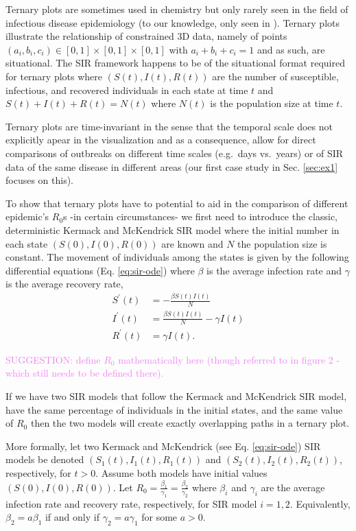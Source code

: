 \documentclass[
  shortnames]{jss}
\begin{document}
Ternary plots are sometimes used in chemistry \citep[][]{Gillespie1976}
but only rarely seen in the field of infectious disease epidemiology (to
our knowledge, only seen in \cite{}). Ternary plots illustrate the
relationship of constrained 3D data, namely of points
\((a_i, b_i, c_i) \in [0,1] \times [0,1] \times [0,1]\) with
\(a_i+ b_i + c_i =1\) and as such, are situational. The SIR framework
happens to be of the situational format required for ternary plots where
\((S(t), I(t), R(t))\) are the number of susceptible, infectious, and
recovered individuals in each state at time \(t\) and
\(S(t) + I(t) + R(t) = N(t)\) where \(N(t)\) is the population size at
time \(t\).

Ternary plots are time-invariant in the sense that the temporal scale
does not explicitly apear in the visualization and as a consequence,
allow for direct comparisons of outbreaks on different time scales
(e.g.~days vs.~years) or of SIR data of the same disease in different
areas (our first case study in Sec. \ref{sec:ex1} focuses on this).

To show that ternary plots have to potential to aid in the comparison of
different epidemic's \(R_0\)s -in certain circumstances- we first need
to introduce the classic, deterministic Kermack and McKendrick
\cite{CITETHIS?} SIR model where the initial number in each state
\((S(0), I(0), R(0))\) are known and \(N\) the population size is
constant. The movement of individuals among the states is given by the
following differential equations (Eq. \eqref{eq:sir-ode}) where
\(\beta\) is the average infection rate and \(\gamma\) is the average
recovery rate, \begin{align}\label{eq:sir-ode}
      S^\prime(t) &= -\frac{\beta S(t)I(t)}{N} \\
      I^\prime(t) &= \frac{\beta S(t)I(t)}{N} - \gamma I(t) \nonumber\\
      R^\prime(t) &= \gamma I(t) \nonumber.
  \end{align}

\textcolor{violet}{SUGGESTION: define $R_0$ mathematically here (though referred to in figure 2 - which still needs to be defined there).}

If we have two SIR models that follow the Kermack and McKendrick SIR
model, have the same percentage of individuals in the initial states,
and the same value of \(R_0\) then the two models will create exactly
overlapping paths in a ternary plot.

More formally, let two Kermack and McKendrick (see Eq.
\eqref{eq:sir-ode}) SIR models be denoted \((S_1(t), I_1(t), R_1(t))\)
and \((S_2(t), I_2(t), R_2(t))\), respectively, for \(t > 0\). Assume
both models have initial values \((S(0), I(0), R(0))\). Let
\(R_0 = \frac{\beta_1}{\gamma_1} = \frac{\beta_2}{\gamma_2}\) where
\(\beta_i\) and \(\gamma_i\) are the average infection rate and recovery
rate, respectively, for SIR model \(i=1, 2\). Equivalently,
\(\beta_2 = a \beta_1\) if and only if \(\gamma_2 = a \gamma_1\) for
some \(a > 0\).
\end{document}
